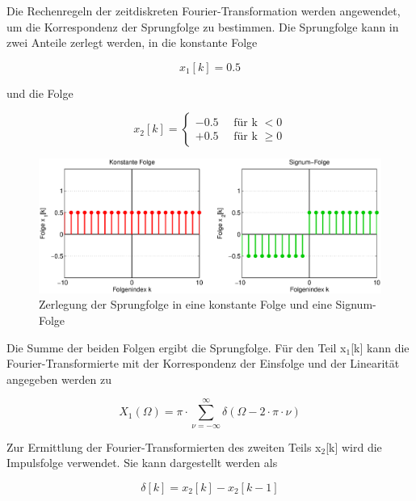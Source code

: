 \noindent Die Rechenregeln der zeitdiskreten Fourier-Transformation werden angewendet, um die Korrespondenz der Sprungfolge zu bestimmen. Die Sprungfolge kann in zwei Anteile zerlegt werden, in die konstante Folge 

\begin{equation}\label{eq:sevenninetyone}
x_{1} \left[k\right]=0.5
\end{equation}

\noindent und die Folge

\begin{equation}\label{eq:sevenninetytwo}
x_{2} \left[k\right]=\left\{\begin{array}{l} {-0.5\quad \text{ für k }<0} \\ {+0.5\quad \text{ für k }\ge 0} \end{array}\right. 
\end{equation}

\begin{figure}[H]
  \centerline{\includegraphics[width=1\textwidth]{Kapitel7/Bilder/image12.eps}}
  \caption{Zerlegung der Sprungfolge in eine konstante Folge und eine Signum-Folge}
  \label{fig:FourierSprungfolge}
\end{figure}

\noindent Die Summe der beiden Folgen ergibt die Sprungfolge. F\"{u}r den Teil x${}_{1}$[k] kann die Fourier-Transformierte mit der Korrespondenz der Einsfolge und der Linearit\"{a}t angegeben werden zu

\begin{equation}\label{eq:sevenninetythree}
X_{1} \left(\Omega \right)=\pi \cdot \sum _{\nu =-\infty }^{\infty }\delta \left(\Omega -2\cdot \pi \cdot \nu \right)
\end{equation}

\noindent Zur Ermittlung der Fourier-Transformierten des zweiten Teils x${}_{2}$[k] wird die Impulsfolge verwendet. Sie kann dargestellt werden als

\begin{equation}\label{eq:sevenninetytfour}
\delta \left[k\right]=x_{2} \left[k\right]-x_{2} \left[k-1\right]
\end{equation}

